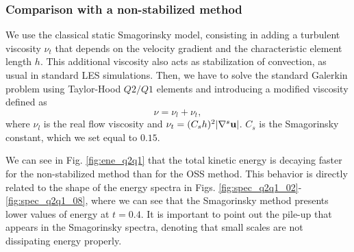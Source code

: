  \subsubsection{Comparison with a non-stabilized method}

 We use the classical static Smagorinsky model, consisting in adding a turbulent viscosity $\nu_t$ that depends on the velocity gradient and the characteristic element length $h$. This additional viscosity also acts as stabilization of convection, as usual in standard LES simulations. Then, we have to solve the standard Galerkin problem using Taylor-Hood $Q2/Q1$ elements and introducing a modified viscosity defined as
 \begin{equation}
 \label{eq-C4_nu_smago}
 \nu = \nu_l+\nu_t,
 \end{equation}
 where $\nu_l$ is the real flow viscosity and $\nu_t=(C_sh)^2|\nabla^s{\bf u}|$. $C_s$ is the Smagorinsky constant, which we set equal to $0.15$.

 We can see in Fig. \ref{fig:ene_q2q1} that the total kinetic energy is decaying faster for the non-stabilized method than for the OSS method. This behavior is directly related to the shape of the energy spectra in Figs. \ref{fig:spec_q2q1_02}-\ref{fig:spec_q2q1_08}, where we can see that the Smagorinsky method presents lower values of energy at $t=0.4$. It is important to point out the pile-up that appears in the Smagorinsky spectra, denoting that small scales are not dissipating energy properly.

